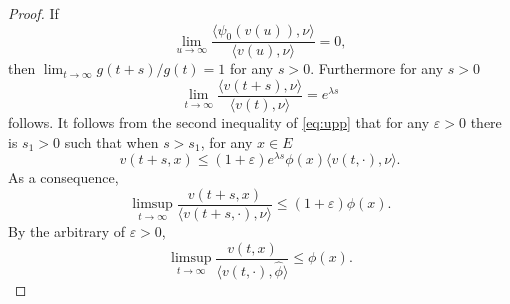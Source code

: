 \documentclass[12pt,a4paper]{amsart}
\theoremstyle{plain}
\theoremstyle{definition}
\numberwithin{equation}{section}
\begin{document}
\begin{proof}
If
\begin{equation}\label{svfcondition}
\lim_{u\rightarrow\infty}\dfrac{\langle\psi_0(v(u)),\nu\rangle}{\langle v(u),\nu\rangle}=0,
\end{equation}
then $\lim_{t\rightarrow\infty}g(t+s)/g(t)=1$ for any $s>0$.  Furthermore for any $s>0$
\[
\lim_{t\rightarrow\infty}\dfrac{\langle v(t+s),\nu\rangle}{\langle v(t),\nu\rangle}=e^{\lambda s}
\]
follows.
	It follows from the second inequality of \eqref{eq:upp} that for any $\varepsilon>0$ there is $s_1>0$ such that when $s>s_1$, for any $x\in E$
\[
	v(t+s,x)\leq (1+\varepsilon)e^{\lambda s}\phi(x)\langle v(t,\cdot),\nu\rangle .
\]
	As a consequence,
\[
	\limsup_{t\rightarrow\infty}\frac{v(t+s,x)}{\langle v(t+s,\cdot),\nu\rangle }\leq (1+\varepsilon)\phi(x).
\]
	By the arbitrary of $\varepsilon>0$,
\begin{equation}\label{limsup}
	\limsup_{t\rightarrow\infty}\frac{v(t,x)}{\langle v(t,\cdot),\hat\phi\rangle }\leq \phi(x).

\end{equation}
\end{proof}
\end{document}
